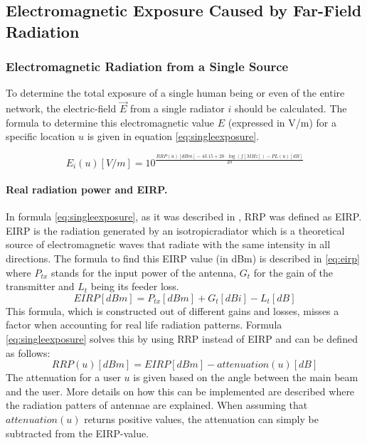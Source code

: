 \subsection{Electromagnetic Exposure Caused by Far-Field Radiation} %
\label{sub:Calculatingdownlinkexpsure}


\subsubsection{Electromagnetic Radiation from a Single Source}
\label{sec:calculatingexposure}

To determine the total exposure of a single human being or even of the entire network, the electric-field $\vec{E}$ from a single radiator $i$ should be calculated.
The formula to determine this electromagnetic value $E$ (expressed in V/m) for a specific location $u$ is given in equation \ref{eq:singleexposure}.

\begin{equation}
E_i(u) [V/m] = 10^{\frac{RRP(u)[dBm] - 43.15 + 20\cdot\log(f [MHz])- PL(u) [dB]}{20}}
\label{eq:singleexposure}
\end{equation}

\paragraph{Real radiation power and EIRP.}
In formula \ref{eq:singleexposure}, as it was described in \cite{J6_originalExposureFormula, J1}, 
\gls{RRP} was defined as \gls{EIRP}. \gls{EIRP} is the radiation generated by an \gls{isotropicradiator} which is
a theoretical source of electromagnetic waves that radiate with the same intensity in all directions. 
The formula to find this \gls{EIRP} value (in dBm) is described in \ref{eq:eirp}
where $P_{tx}$ stands for the input power of the antenna, $G_t$ for the gain of the transmitter and $L_t$ being its feeder loss.
\begin{equation}
EIRP [dBm] = P_{tx} [dBm] + G_t [dBi]- L_t [dB]
\label{eq:eirp}
\end{equation}
This formula, which is constructed out of different gains and losses, misses a factor when accounting for real life radiation patterns.
Formula \ref{eq:singleexposure} solves this by using \gls{RRP} instead of \gls{EIRP} and can be defined as follows:
\begin{equation}
RRP(u) [dBm] = EIRP [dBm] - attenuation(u) [dB]
\label{eq:rrp}
\end{equation}
The attenuation for a user $u$ is given based on the angle between the main beam and the user. More details on how this can be implemented are described where the radiation patters of antennae are explained.
When assuming that $attenuation(u)$ returns positive values, the attenuation can simply be subtracted from the EIRP-value.

